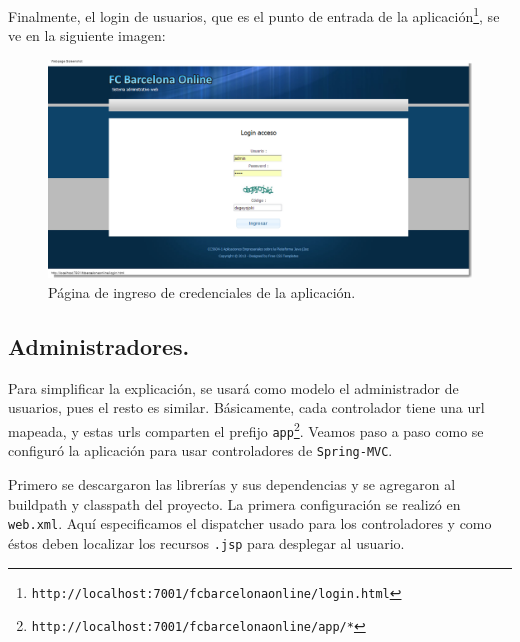 \documentclass[letter]{article}
\begin{document}
Finalmente, el login de usuarios, que es el punto de entrada de la aplicación\footnote{\texttt{http://localhost:7001/fcbarcelonaonline/login.html}}, se ve en la siguiente imagen:

\begin{figure}
  \includegraphics[width=\textwidth]{figs/fig1.png}
\caption{Página de ingreso de credenciales de la aplicación.}
\end{figure}

\subsection{Administradores.}
Para simplificar la explicación, se usará como modelo el administrador de usuarios, pues el resto es similar. Básicamente, cada controlador tiene una url mapeada, y estas urls comparten el prefijo \texttt{app}\footnote{\texttt{http://localhost:7001/fcbarcelonaonline/app/*}}. Veamos paso a paso como se configuró la aplicación para usar controladores de \texttt{Spring-MVC}.

Primero se descargaron las librerías y sus dependencias y se agregaron al buildpath y classpath del proyecto. La primera configuración se realizó en \texttt{web.xml}. Aquí especificamos el dispatcher usado para los controladores y como éstos deben localizar los recursos \texttt{.jsp} para desplegar al usuario.
\end{document}
